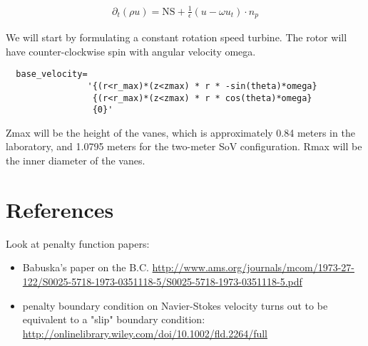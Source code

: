 \documentclass{article}
\begin{document}
\begin{align}
 \partial_t(\rho u) = \text{NS} + \frac{1}{\epsilon}(u-\omega u_t)\cdot n_p
\end{align}

We will start by formulating a constant rotation speed
turbine. The rotor will have counter-clockwise spin with angular
velocity omega.   

\begin{verbatim}
  base_velocity=
                '{(r<r_max)*(z<zmax) * r * -sin(theta)*omega}
                 {(r<r_max)*(z<zmax) * r * cos(theta)*omega}
                 {0}'
\end{verbatim}

Zmax will be the height of the vanes, which is approximately 0.84 meters in the laboratory, 
and 1.0795 meters for the two-meter SoV configuration. Rmax will be the inner diameter of the vanes. 

%

\section{References}
Look at penalty function papers: 
\begin{itemize}
 \item Babuska's paper on the B.C. \url{http://www.ams.org/journals/mcom/1973-27-122/S0025-5718-1973-0351118-5/S0025-5718-1973-0351118-5.pdf}
 \item penalty boundary condition on Navier-Stokes velocity turns out to be equivalent to a "slip" boundary condition: \url{http://onlinelibrary.wiley.com/doi/10.1002/fld.2264/full}
\end{itemize}
\end{document}
